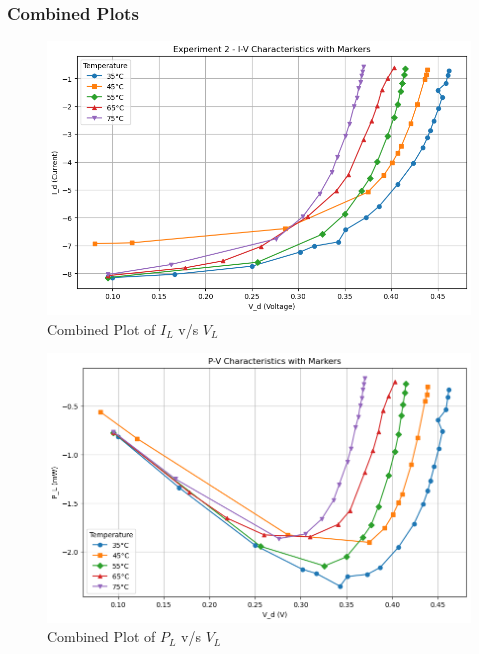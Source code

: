 \documentclass[a4paper]{article}
\begin{document}
\subsubsection{Combined Plots}
\begin{figure}[h!]
    \centering
    \includegraphics[width=1\linewidth]{Lab_5/Post_Lab/Exp_2_Summarised.png}
    \caption{Combined Plot of $I_L$ v/s $V_L$}
\end{figure}
\begin{figure}[h!]
    \centering
    \includegraphics[width=1\linewidth]{Lab_5/Post_Lab/P_L_vs_V_d_Exp_2_Combined.png}
    \caption{Combined Plot of $P_L$ v/s $V_L$}
\end{figure}
\newpage
\end{document}
